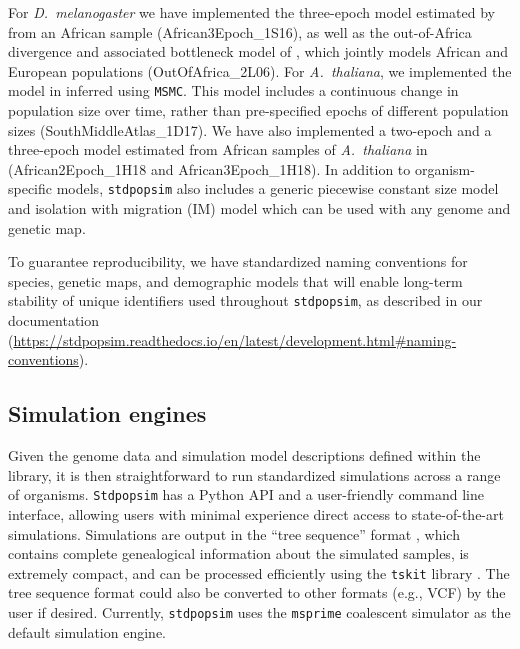 \documentclass[12pt,halfline,a4paper]{ouparticle}
\newcommand{\Stdpopsim}{\texttt{Stdpopsim}\xspace}
\newcommand{\stdpopsim}{\texttt{stdpopsim}\xspace}
\newcommand{\MSMC}{\texttt{MSMC}\xspace}
\newcommand{\tskit}{\texttt{tskit}\xspace}
\begin{document}
For \textit{D.~melanogaster} we have implemented the three-epoch model estimated by \cite{sheehan2016deep} from
an African sample (African3Epoch\_1S16), as well as the out-of-Africa divergence
and associated bottleneck model of \cite{li2006inferring}, which jointly models African
and European populations (OutOfAfrica\_2L06). For \textit{A.~thaliana}, we implemented the
model in \cite{durvasula2017african} inferred using \MSMC. This model includes
a continuous change in population size over time, rather than pre-specified epochs of different
population sizes (SouthMiddleAtlas\_1D17). We have also implemented a two-epoch and a three-epoch model estimated from African
samples of \textit{A.~thaliana} in \cite{huber2018gene} (African2Epoch\_1H18 and African3Epoch\_1H18).
In addition to organism-specific models, \stdpopsim also includes a generic piecewise constant size model and
isolation with migration (IM) model which can be used with any genome and genetic map.

To guarantee reproducibility,
we have standardized naming
conventions for species, genetic maps, and demographic models that will enable long-term stability
of unique identifiers used throughout \stdpopsim,
as described in our documentation
(\url{https://stdpopsim.readthedocs.io/en/latest/development.html#naming-conventions}).

 \subsection*{Simulation engines}

Given the genome data and simulation model descriptions defined within the
library, it is then straightforward to run standardized simulations
across a range of organisms. \Stdpopsim has a Python API and a user-friendly
command line interface, allowing users with minimal experience direct access to
state-of-the-art simulations. Simulations are output in the ``tree sequence''
format \citep{kelleher2016efficient,kelleher2018efficient,kelleher2019inferring}, which
contains complete genealogical information about the simulated samples, is
extremely compact, and can be processed efficiently using the \tskit library
\citep{kelleher2016efficient,kelleher2018efficient}.
The tree sequence format could also be converted
to other formats (e.g., VCF) by the user if desired.
Currently, \stdpopsim uses the  \texttt{msprime} coalescent simulator \citep{kelleher2016efficient}
as the default simulation engine.
\end{document}
